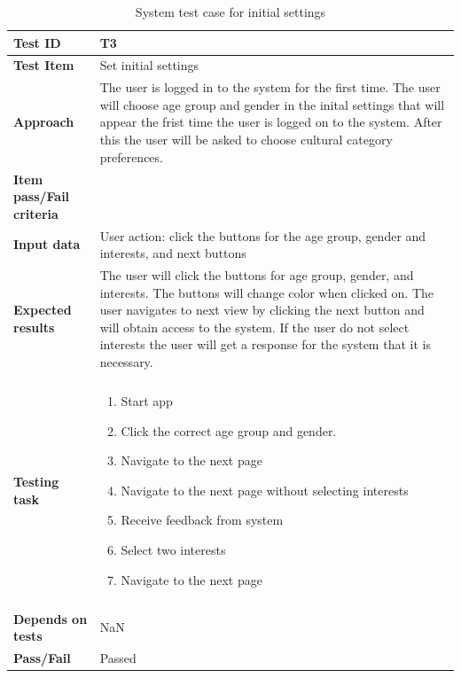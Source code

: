 \begin{appendices}
\begin{table}[H]
	\label{Tab_systemTesting2}
	\end{table}

	\begin{table}[H]
		\small
		\centering
		\caption{System test case for initial settings}
		\begin{tabular}{ | l | l |}			
			\hline
			\textbf{Test ID} & T3  \\ \hline
			\textbf{Test Item} & Set initial settings \\ \hline
			\textbf{Approach} & \begin{minipage}{5in}The user is logged in to the system for the first time. The user will choose age group and gender in the inital settings that will appear the frist time the user is logged on to the system. After this the user will be asked to choose cultural category preferences.  \end{minipage}\\ \hline
			\textbf{Item pass/Fail criteria} & \\ \hline
			\textbf{Input data} & \begin{minipage}{5in} User action: click the buttons for the age group, gender and interests, and next buttons  \end{minipage}\\ \hline
			\textbf{Expected results} & \begin{minipage}{5in}The user will click the buttons for age group, gender, and interests. The buttons will change color when clicked on. The user navigates to next view by clicking the next button and will obtain access to the system. If the user do not select interests the user will get a response for the system that it is necessary. \end{minipage}\\ \hline&\\[-3.8ex]
			\textbf{Testing task} & \begin{minipage}{5in}
			\begin{enumerate}[noitemsep]
				\item Start app
				\item Click the correct age group and gender.
				\item Navigate to the next page
				\item Navigate to the next page without selecting interests
				\item Receive feedback from system
				\item Select two interests
				\item Navigate to the next page
			\end{enumerate}\end{minipage}
			\\ &\\[-3.8ex]\hline
			\textbf{Depends on tests} & NaN \\ \hline	
			\textbf{Pass/Fail} & Passed \\\hline				
		\end{tabular}
	\label{Tab:systemTesting3}
	\end{table}



\end{appendices}
